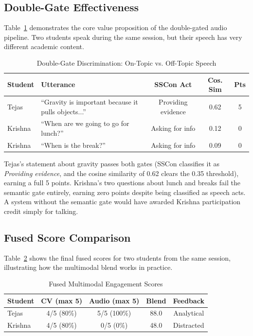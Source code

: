 \documentclass[conference]{IEEEtran}
\begin{document}
\subsection{Double-Gate Effectiveness}
Table~\ref{tab:gate_demo} demonstrates the core value proposition of the double-gated audio pipeline. Two students speak during the same session, but their speech has very different academic content.

\begin{table}[htbp]
\caption{Double-Gate Discrimination: On-Topic vs. Off-Topic Speech}
\begin{center}
\begin{tabular}{|p{1.4cm}|p{2.4cm}|c|c|c|}
\hline
\textbf{Student} & \textbf{Utterance} & \textbf{SSCon Act} & \textbf{Cos. Sim} & \textbf{Pts} \\
\hline
Tejas & ``Gravity is important because it pulls objects...'' & Providing evidence & 0.62 & 5 \\
\hline
Krishna & ``When are we going to go for lunch?'' & Asking for info & 0.12 & 0 \\
\hline
Krishna & ``When is the break?'' & Asking for info & 0.09 & 0 \\
\hline
\end{tabular}
\label{tab:gate_demo}
\end{center}
\end{table}

Tejas's statement about gravity passes both gates (SSCon classifies it as \emph{Providing evidence}, and the cosine similarity of 0.62 clears the 0.35 threshold), earning a full 5 points. Krishna's two questions about lunch and breaks fail the semantic gate entirely, earning zero points despite being classified as speech acts. A system without the semantic gate would have awarded Krishna participation credit simply for talking.

\subsection{Fused Score Comparison}
Table~\ref{tab:fused} shows the final fused scores for two students from the same session, illustrating how the multimodal blend works in practice.

\begin{table}[htbp]
\caption{Fused Multimodal Engagement Scores}
\begin{center}
\begin{tabular}{|l|c|c|c|c|}
\hline
\textbf{Student} & \textbf{CV (max 5)} & \textbf{Audio (max 5)} & \textbf{Blend} & \textbf{Feedback} \\
\hline
Tejas & 4/5 (80\%) & 5/5 (100\%) & 88.0 & Analytical \\
\hline
Krishna & 4/5 (80\%) & 0/5 (0\%) & 48.0 & Distracted \\
\hline
\end{tabular}
\label{tab:fused}
\end{center}
\end{table}
\end{document}
